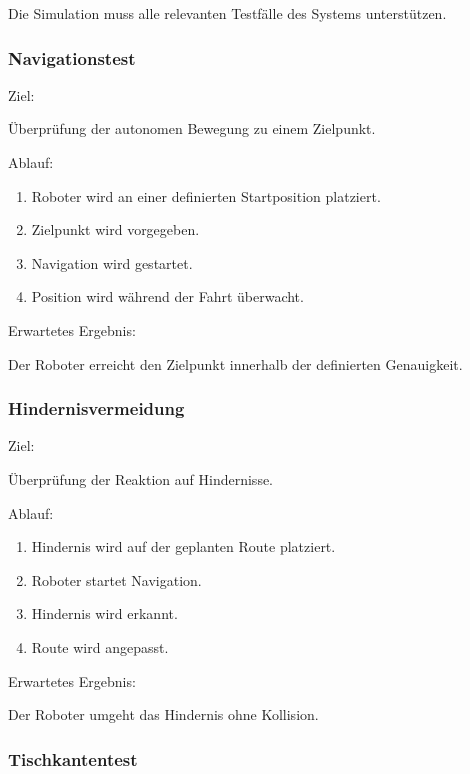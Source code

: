 \documentclass[
  a4paper,
  12pt,
  DIV=12,        %
  parskip=half,  %
  headings=small %
]{scrartcl}
\theoremstyle{definition}
\providecommand{\tightlist}{%
  \setlength{\itemsep}{0pt}\setlength{\parskip}{0pt}}
\theoremstyle{definition}
\begin{document}
Die Simulation muss alle relevanten Testfälle des Systems unterstützen.

\subsubsection{Navigationstest}\label{navigationstest}

Ziel:

Überprüfung der autonomen Bewegung zu einem Zielpunkt.

Ablauf:

\begin{enumerate}
\def\labelenumi{\arabic{enumi}.}
\tightlist
\item
  Roboter wird an einer definierten Startposition platziert.
\item
  Zielpunkt wird vorgegeben.
\item
  Navigation wird gestartet.
\item
  Position wird während der Fahrt überwacht.
\end{enumerate}

Erwartetes Ergebnis:

Der Roboter erreicht den Zielpunkt innerhalb der definierten
Genauigkeit.

\subsubsection{Hindernisvermeidung}\label{hindernisvermeidung}

Ziel:

Überprüfung der Reaktion auf Hindernisse.

Ablauf:

\begin{enumerate}
\def\labelenumi{\arabic{enumi}.}
\tightlist
\item
  Hindernis wird auf der geplanten Route platziert.
\item
  Roboter startet Navigation.
\item
  Hindernis wird erkannt.
\item
  Route wird angepasst.
\end{enumerate}

Erwartetes Ergebnis:

Der Roboter umgeht das Hindernis ohne Kollision.

\subsubsection{Tischkantentest}\label{tischkantentest}
\end{document}
